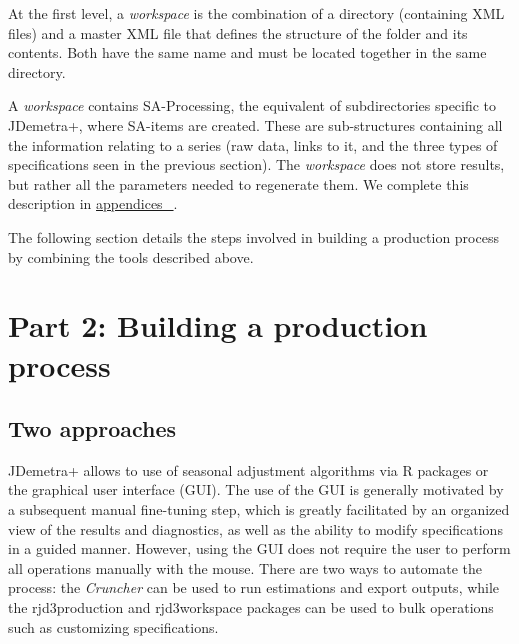 \documentclass[
  letterpaper,
  DIV=11,
  numbers=noendperiod]{scrreprt}
\begin{document}
At the first level, a \emph{workspace} is the combination of a directory
(containing XML files) and a master XML file that defines the structure
of the folder and its contents. Both have the same name and must be
located together in the same directory.

A \emph{workspace} contains SA-Processing, the equivalent of
subdirectories specific to JDemetra+, where SA-items are created. These
are sub-structures containing all the information relating to a series
(raw data, links to it, and the three types of specifications seen in
the previous section). The \emph{workspace} does not store results, but
rather all the parameters needed to regenerate them. We complete this
description in \protect\hyperlink{data-structures}{appendices~🔗}.

The following section details the steps involved in building a
production process by combining the tools described above.


\hypertarget{part-2-building-a-production-process}{%
\chapter*{Part 2: Building a production
process}\label{part-2-building-a-production-process}}


\hypertarget{two-approaches}{%
\section*{Two approaches}\label{two-approaches}}


JDemetra+ allows to use of seasonal adjustment algorithms via R packages
or the graphical user interface (GUI). The use of the GUI is generally
motivated by a subsequent manual fine-tuning step, which is greatly
facilitated by an organized view of the results and diagnostics, as well
as the ability to modify specifications in a guided manner. However,
using the GUI does not require the user to perform all operations
manually with the mouse. There are two ways to automate the process: the
\emph{Cruncher} can be used to run estimations and export outputs, while
the rjd3production and rjd3workspace packages can be used to bulk
operations such as customizing specifications.
\end{document}
